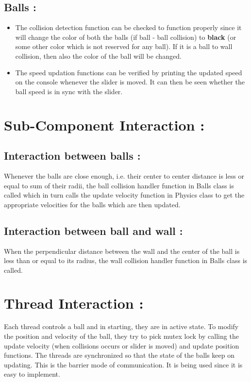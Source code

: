 \documentclass[]{article}
\begin{document}
\subsection{Balls :}
\Large\begin{itemize}
	\item The collision detection function can be checked to function properly since it will change the color of both the balls (if ball - ball collision) to \textbf{black} (or some other color which is not reserved for any ball). If it is a ball to wall collision, then also the color of the ball will be changed.
	\item The speed updation functions can be verified by printing the updated speed on the console whenever the slider is moved. It can then be seen whether the ball speed is in sync with the slider.
\end{itemize}

\section{\LARGE Sub-Component Interaction :}
\subsection{Interaction between balls :} 
\Large
Whenever the balls are close enough, i.e. their center to center distance is less or equal to sum of their radii, the ball collision handler function in Balls class is called which in turn calls the update velocity function in Physics class to get the appropriate velocities for the balls which are then updated. 

\subsection{Interaction between ball and wall :}
\Large
When the perpendicular distance between the wall and the center of the ball is less than or equal to its radius, the wall collision handler function in Balls class is called. 

\section{\LARGE Thread Interaction :}
\Large Each thread controls a ball and in starting, they are in active state. To modify the position and velocity of the ball, they try to pick mutex lock by calling the update velocity (when collisions occurs or slider is moved) and update position functions. The threads are synchronized so that the state of the balls keep on updating. 
This is the barrier mode of communication. It is being used since it is easy to implement.
\end{document}
